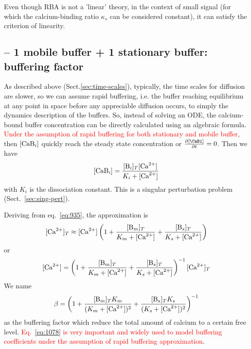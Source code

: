 Even though RBA is not a 'linear' theory, in the context of small signal (for
which the calcium-binding ratio $\kappa_s$ can be considered constant), it can
satisfy the criterion of linearity.


\subsection{-- 1 mobile buffer + 1 stationary buffer: buffering factor}
\label{sec:buffering-factor}

As described above (Sect.\ref{sec:time-scales}), typically, the time scales for
diffusion are slower, so we can assume rapid buffering, i.e. the buffer reaching
equilibrium at any point in space before any appreciable diffusion occurs, to
simply the dynamics description of the buffers. So, instead of solving an ODE,
the calcium-bound buffer concentration can be directly calculated using an
algebraic formula.
\textcolor{red}{Under the assumption of rapid buffering for both stationary and
mobile buffer}, then $\ce{[CaB_i]}$ quickly reach the steady state concentration
or $\frac{\partial [\CaBi]}{\partial t} = 0$. Then we have
\begin{equation}
  \label{eq:937}
  \ce{[CaB_i]} = \frac{[\ce{B_i}]_T[\Ca]}{K_i+[\Ca]}
\end{equation}
with $K_i$ is the dissociation constant.  This is a singular
perturbation problem (Sect.~\ref{sec:sing-pert}).

Deriving from eq.~\eqref{eq:935}, the approximation is
\begin{eqnarray}
  \label{eq:1079}
  [\Ca]_T \approx [\Ca] \left( 1 + \frac{[\ce{B_m}]_T}{K_m+[\Ca]}  +
    \frac{[\ce{B_s}]_T}{K_s+[\Ca]} \right)
\end{eqnarray}
or
\begin{equation}
  \label{eq:938}
  [\Ca]=\left( 1 + \frac{[\ce{B_m}]_T}{K_m+[\Ca]}  +
    \frac{[\ce{B_s}]_T}{K_s+[\Ca]} \right)^{-1} [\Ca]_T
\end{equation}
We name
\begin{equation}
  \label{eq:939}
  \beta = \left( 1 + \frac{[\ce{B_m}]_TK_m}{(K_m+[\Ca])^2}  +
    \frac{[\ce{B_s}]_TK_s}{(K_s+[\Ca])^2} \right)^{-1}
\end{equation}
as the buffering factor which reduce the total amount of calcium to a
certain free level.
\textcolor{red}{Eq.~\eqref{eq:1078} is very important and widely used
  to model buffering coefficients under the assumption of rapid
  buffering approximation}.
  
